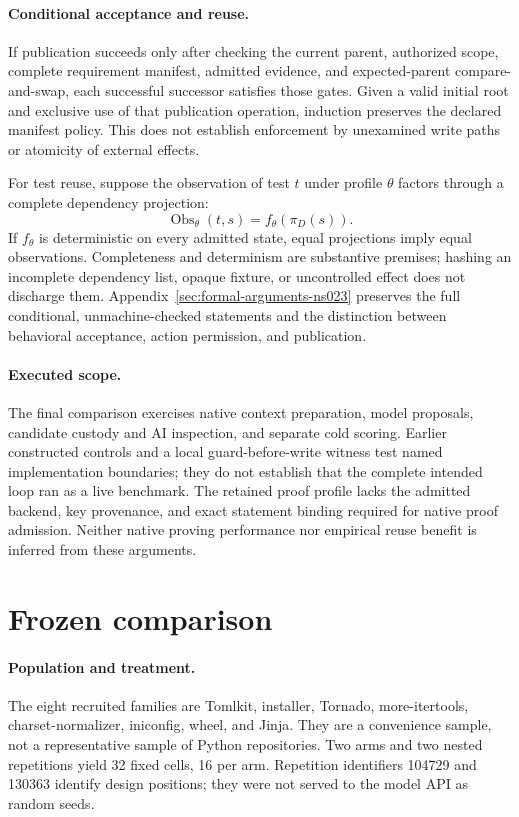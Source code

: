 \documentclass{article}
\begin{document}
\paragraph{Conditional acceptance and reuse.}
If publication succeeds only after checking the current parent, authorized
scope, complete requirement manifest, admitted evidence, and expected-parent
compare-and-swap, each successful successor satisfies those gates. Given a valid
initial root and exclusive use of that publication operation, induction
preserves the declared manifest policy. This does not establish enforcement by
unexamined write paths or atomicity of external effects.

For test reuse, suppose the observation of test $t$ under profile $\theta$
factors through a complete dependency projection:
\[
  \operatorname{Obs}_{\theta}(t,s)=f_{\theta}(\pi_D(s)).
\]
If $f_\theta$ is deterministic on every admitted state, equal projections imply
equal observations. Completeness and determinism are substantive premises;
hashing an incomplete dependency list, opaque fixture, or uncontrolled effect
does not discharge them. Appendix~\ref{sec:formal-arguments-ns023} preserves
the full conditional, unmachine-checked statements and the distinction between
behavioral acceptance, action permission, and publication.

\paragraph{Executed scope.}
The final comparison exercises native context preparation, model proposals,
candidate custody and AI inspection, and separate cold scoring. Earlier
constructed controls and a local guard-before-write witness test named
implementation boundaries; they do not establish that the complete intended
loop ran as a live benchmark. The retained proof profile lacks the admitted
backend, key provenance, and exact statement binding required for native proof
admission. Neither native proving performance nor empirical reuse benefit is
inferred from these arguments.

\section{Frozen comparison}
\label{sec:design}

\paragraph{Population and treatment.}
The eight recruited families are Tomlkit, installer, Tornado, more-itertools,
charset-normalizer, iniconfig, wheel, and Jinja. They are a convenience sample,
not a representative sample of Python repositories. Two arms and two nested
repetitions yield 32 fixed cells, 16 per arm. Repetition identifiers 104729 and
130363 identify design positions; they were not served to the model API as
random seeds.
\end{document}
